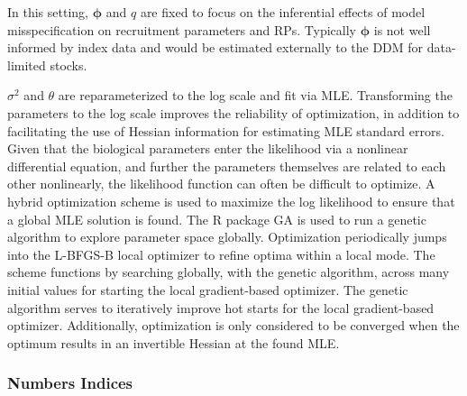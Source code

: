 %
In this setting, $\bm{\phi}$ and $q$ are fixed %
to focus on the inferential effects of model misspecification on recruitment
parameters and RPs. Typically $\bm{\phi}$ is not well informed by index data and %
would be estimated externally to the DDM for data-limited stocks.
%

%
$\sigma^2$ and $\theta$ are reparameterized to the log scale and fit via MLE.
Transforming the parameters to the log scale improves the reliability of
optimization, in addition to facilitating the use of Hessian information for
estimating MLE standard errors. Given that the biological parameters enter the
likelihood via a nonlinear differential equation, and further the parameters
themselves are related to each other nonlinearly, the likelihood function can
often be difficult to optimize. A hybrid optimization scheme is used to
maximize the log likelihood to ensure that a global MLE solution is found. The
R package GA \cite{scrucca_ga_2013, scrucca_extensions_2017} is used to
run a genetic algorithm to explore parameter space globally. Optimization
periodically jumps into the L-BFGS-B local optimizer to refine optima within a
local mode. The scheme functions by searching globally, with the genetic
algorithm, across many initial values for starting the local gradient-based
optimizer. The genetic algorithm serves to iteratively improve hot starts for
the local gradient-based optimizer. Additionally, optimization is only
considered to be converged when the optimum results in an invertible Hessian at
the found MLE.

%
\subsubsection{Numbers Indices}


